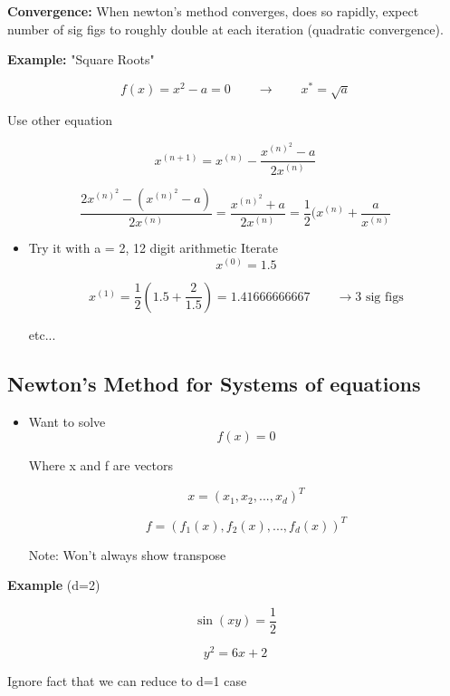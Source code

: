 \textbf{Convergence:} When newton's method converges, does so rapidly, expect number of sig figs to roughly double at each iteration (quadratic convergence).

\vspace{10 px}

\textbf{Example:} "Square Roots"

\begin{equation}
    f(x) = x^2 - a = 0 \qquad \rightarrow \qquad  x^* = \sqrt{a}
\end{equation}

Use other equation

\[ x^{(n+1)} = x^{(n)} - \frac{x^{(n)^2}-a}{2x^{(n)}}\]

\begin{equation}
    \frac{2x^{(n)^2}-(x^{(n)^2}-a)}{2x^{(n)}} = \frac{x^{(n)^2}+a}{2x^{(n)}} = \frac{1}{2} (x^{(n)} + \frac{a}{x^{(n)}}
\end{equation}

\begin{itemize}
    \item Try it with a = 2, 12 digit arithmetic 
    \vspace{10 px}
    Iterate
    \[ x^{(0)} = 1.5\]

    \[ x^{(1)} = \frac{1}{2}(1.5+\frac{2}{1.5}) = 1.416 6666 6667 \qquad \rightarrow \text{3 sig figs}\]

    etc...
\end{itemize}

\subsection{Newton's Method for Systems of equations}

\begin{itemize}
    \item Want to solve
    \[f(x) =0\]

    Where x and f are vectors

    \[x = (x_1 , x_2, ..., x_d)^T\]

    \[ f = (f_1(x), f_2(x),...,f_d(x))^T\]

    Note: Won't always show transpose
    
\end{itemize}

\textbf{Example} (d=2)

\[\sin(xy) = \frac{1}{2}\]

\[ y^2 = 6x+2\]

Ignore fact that we can reduce to d=1 case

